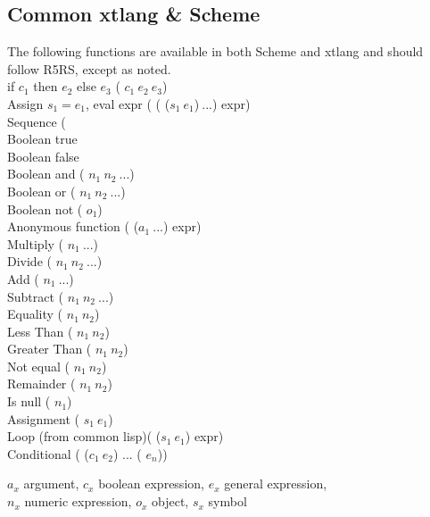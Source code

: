 \documentclass[10pt, twoside]{article}   	%
\begin{document}
\begin{multicols}{3}
\section*{Common xtlang \& Scheme}
The following functions are available in both Scheme and xtlang and should follow R5RS, except as noted.\\
if $c_{1}$ then $e_{2}$ else $e_{3}$
					\hfill( $c_{1}\:e_{2}\:e_{3}$) \\
Assign $s_1 = e_1$, eval expr
					\hfill( ( ($s_1\:e_1$)$\:\mathit{. . .}$) expr) \\
Sequence				\hfill( \\
Boolean true			\hfill{} \\
Boolean false			\hfill{} \\
Boolean and			\hfill( $n_1\:n_2\:\mathit{. . .}$) \\
Boolean or			\hfill( $n_1\:n_2\:\mathit{. . .}$) \\
Boolean not			\hfill( $o_1$) \\
Anonymous function		\hfill( ($a_{1}\:\mathit{...}$) expr)\\
Multiply				\hfill(\xtSchemeVerb{*} $n_1\:\mathit{. . .}$) \\
Divide				\hfill(\xtSchemeVerb{/} $n_1\:n_2\:\mathit{. . .}$) \\
Add					\hfill(\xtSchemeVerb{+} $n_1\:\mathit{. . .}$) \\
Subtract				\hfill(\xtSchemeVerb{-} $n_1\:n_2\:\mathit{. . .}$) \\
Equality				\hfill(\xtSchemeVerb{=} $n_1\:n_2$) \\
Less Than				\hfill(\xtSchemeVerb{\textless} $n_1\:n_2$) \\
Greater Than			\hfill(\xtSchemeVerb{\textgreater} $n_1\:n_2$) \\
Not equal				\hfill(\xtSchemeVerb{\textless\textgreater} $n_1\:n_2$) \\
Remainder			\hfill( $n_1\:n_2$) \\
Is null				\hfill( $n_1$) \\
Assignment			\hfill( $s_1\:e_1$) \\
Loop {\scriptsize(from common lisp)}\hfill( ($s_1\:e_1$) expr)\\
Conditional			\hfill( ($c_{1}\:e_{2}$) $\mathit{. . .}$ ( $e_{n}$)) \\
\scriptsize
{\raggedright
$a_x$ argument,
$c_x$ boolean expression,
$e_x$ general expression, \\
$n_x$ numeric expression, 
$o_x$ object,
$s_x$ symbol\par}
\normalsize



\end{multicols}
\end{document}
